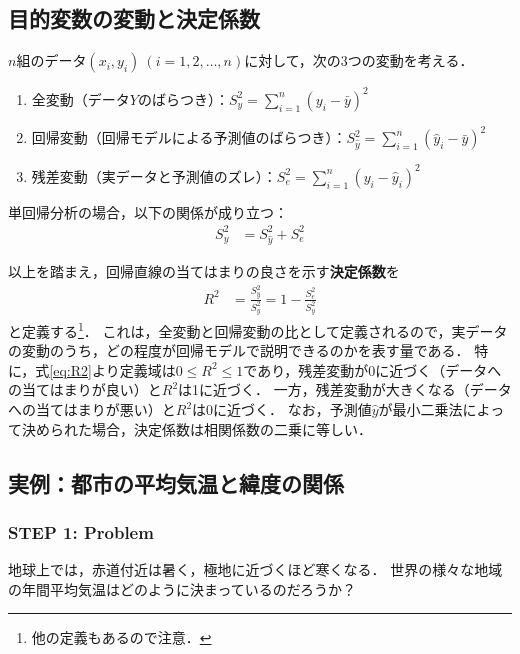 \subsection{目的変数の変動と決定係数}
%
$ n $組のデータ$ (x_{i}, y_{i})\ (i=1, 2, \ldots, n) $に対して，次の3つの変動を考える．
%
\begin{enumerate}
%
\item{全変動（データ$ Y $のばらつき）：$\displaystyle S_{y}^{2} = \sum_{i=1}^{n} (y_{i} - \bar{y})^{2}$}

\item{回帰変動（回帰モデルによる予測値のばらつき）：$\displaystyle S_{\hat{y}}^{2} = \sum_{i=1}^{n} (\hat{y}_{i} - \bar{y})^{2}$}

\item{残差変動（実データと予測値のズレ）：$\displaystyle S_{e}^{2} = \sum_{i=1}^{n} (y_{i} - \hat{y}_{i})^{2}$}
\end{enumerate}
%
単回帰分析の場合，以下の関係が成り立つ：
%
\begin{align*}
	S_{y}^{2} &= S_{\hat{y}}^{2} + S_{e}^{2}
\end{align*}
%

%
以上を踏まえ，回帰直線の当てはまりの良さを示す\textbf{決定係数}を
%
\begin{align}
	R^{2} &= \frac{S_{\hat{y}}^{2}}{S_{y}^{2}} = 1 - \frac{S_{e}^{2}}{S_{y}^{2}}
	\label{eq:R2}
\end{align}
%
と定義する\footnote{他の定義もあるので注意．}．
%
これは，全変動と回帰変動の比として定義されるので，実データの変動のうち，どの程度が回帰モデルで説明できるのかを表す量である．
%
特に，式\eqref{eq:R2}より定義域は$ 0 \leq R^{2} \leq 1 $であり，残差変動が0に近づく（データへの当てはまりが良い）と$ R^{2} $は1に近づく．
%
一方，残差変動が大きくなる（データへの当てはまりが悪い）と$ R^{2} $は0に近づく．
%
なお，予測値$ \hat{y} $が最小二乗法によって決められた場合，決定係数は相関係数の二乗に等しい．
%

\subsection{実例：都市の平均気温と緯度の関係}

\subsubsection*{STEP 1: Problem}
%
地球上では，赤道付近は暑く，極地に近づくほど寒くなる．
%
世界の様々な地域の年間平均気温はどのように決まっているのだろうか？
%

